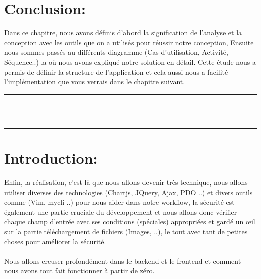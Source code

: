 \documentclass[12pt]{report}
\begin{document}
\vspace{-0.4in}

\section{Conclusion:}
Dans ce chapitre, nous avons définis d'abord la signification de l'analyse et la conception avec les outils que on a utilisés pour réussir notre conception, Ensuite nous sommes passés au différents diagramme (Cas d'utilisation, Activité, Séquence..) la où nous avons expliqué notre solution en détail. Cette étude nous a permis de définir la structure de l’application et cela aussi nous a facilité l’implémentation que vous verrais dans le chapitre suivant.

\newpage

\vspace*{\fill}
\begin{center}
    {\color{Blue} \rule{\linewidth}{1.2mm} }\\
\vspace{0.25in}
    {\centering{}}
\vspace{0.35in}\\
    {\color{Blue} \rule{\linewidth}{1.2mm} }
\end{center}
\vspace*{\fill}
\setcounter{section}{0}

\newpage

\section{Introduction:}

Enfin, la réalisation, c'est là que nous allons devenir très technique, nous allons utiliser diverses des technologies (Chartjs, JQuery, Ajax, PDO ..) et divers outils comme (Vim, mycli ..) pour nous aider dans notre workflow, la sécurité est également une partie cruciale du développement et nous allons donc vérifier chaque champ d'entrée avec ses conditions (spéciales) appropriées et gardé un œil sur la partie téléchargement de fichiers (Images, ..), le tout avec tant de petites choses pour améliorer la sécurité.
\\\\
Nous allons creuser profondément dans le backend et le frontend et comment nous avons tout fait fonctionner à partir de zéro.
\end{document}
